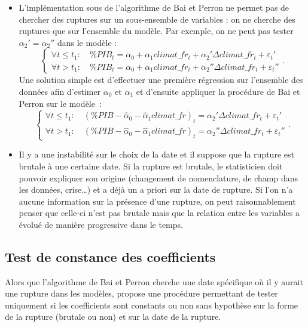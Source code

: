 \documentclass[
  a4paper,
  DIV=11,
  numbers=noendperiod,
  french]{scrartcl}
\newcommand\1{{\mathds 1}}
\theoremstyle{remark}
\begin{document}
\begin{itemize}
\item
  L'implémentation sous  de l'algorithme de Bai et
  Perron ne permet pas de chercher des ruptures sur un sous-ensemble de
  variables : on ne cherche des ruptures que sur l'ensemble du modèle.
  Par exemple, on ne peut pas tester \(\alpha_2' = \alpha_2''\) dans le
  modèle : \[
  \begin{cases}
  \forall t \leq t_1 :\quad \% PIB_t = \alpha_0 + \alpha_1 climat\_fr_t + \alpha_2' \Delta climat\_fr_t + \varepsilon_t' \\
  \forall t > t_1 :\quad \% PIB_t = \alpha_0 + \alpha_1 climat\_fr_t + \alpha_2'' \Delta climat\_fr_t + \varepsilon_t''
  \end{cases}.
  \] Une solution simple est d'effectuer une première régression sur
  l'ensemble des données afin d'estimer \(\alpha_0\) et \(\alpha_1\) et
  d'ensuite appliquer la procédure de Bai et Perron sur le modèle~: \[
  \begin{cases}
  \forall t \leq t_1 :\quad (\% PIB - \hat\alpha_0-\hat \alpha_1 climat\_fr)_t = \alpha_2' \Delta climat\_fr_t + \varepsilon_t' \\
  \forall t > t_1 :\quad (\% PIB - \hat\alpha_0-\hat \alpha_1 climat\_fr)_t = \alpha_2'' \Delta climat\_fr_t + \varepsilon_t''
  \end{cases}.
  \]
\item
  Il y a une instabilité sur le choix de la date et il suppose que la
  rupture est brutale à une certaine date. Si la rupture est brutale, le
  statisticien doit pouvoir expliquer son origine (changement de
  nomenclature, de champ dans les données, crise\ldots) et a déjà un a
  priori sur la date de rupture. Si l'on n'a aucune information sur la
  présence d'une rupture, on peut raisonnablement penser que celle-ci
  n'est pas brutale mais que la relation entre les variables a évolué de
  manière progressive dans le temps.
\end{itemize}

\subsection{Test de constance des coefficients}\label{sec-hansen-test}

Alors que l'algorithme de Bai et Perron cherche une date spécifique où
il y aurait une rupture dans les modèles, \textcite{hansen1992testing}
propose une procédure permettant de tester uniquement si les
coefficients sont constants ou non sans hypothèse sur la forme de la
rupture (brutale ou non) et sur la date de la rupture.
\end{document}
